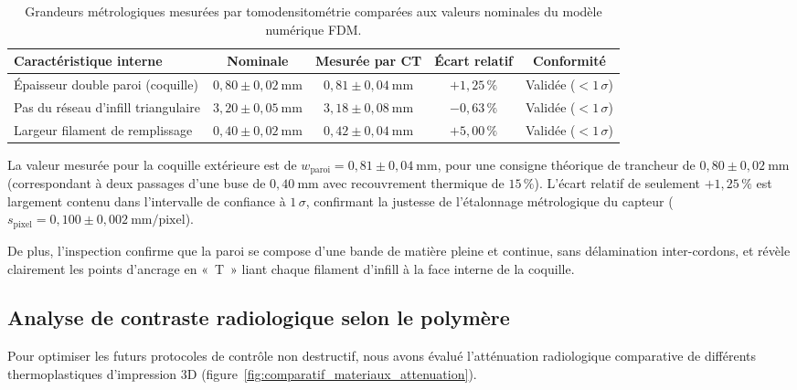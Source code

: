 \begin{table}[h!]
\centering
\small
\setlength{\tabcolsep}{4.5pt}
\caption{Grandeurs métrologiques mesurées par tomodensitométrie comparées aux valeurs nominales du modèle numérique FDM.}
\label{tab:resultats_metrologie}
\begin{tabular}{lcccc}
\toprule
\textbf{Caractéristique interne} & \textbf{Nominale} & \textbf{Mesurée par CT} & \textbf{Écart relatif} & \textbf{Conformité} \\
\midrule
Épaisseur double paroi (coquille) & $0{,}80 \pm 0{,}02~\text{mm}$ & $0{,}81 \pm 0{,}04~\text{mm}$ & $+1{,}25\,\%$ & Validée ($< 1\,\sigma$) \\
Pas du réseau d'infill triangulaire & $3{,}20 \pm 0{,}05~\text{mm}$ & $3{,}18 \pm 0{,}08~\text{mm}$ & $-0{,}63\,\%$ & Validée ($< 1\,\sigma$) \\
Largeur filament de remplissage & $0{,}40 \pm 0{,}02~\text{mm}$ & $0{,}42 \pm 0{,}04~\text{mm}$ & $+5{,}00\,\%$ & Validée ($< 1\,\sigma$) \\
\bottomrule
\end{tabular}
\end{table}

La valeur mesurée pour la coquille extérieure est de $w_{\text{paroi}} = 0{,}81 \pm 0{,}04~\text{mm}$, pour une consigne théorique de trancheur de $0{,}80 \pm 0{,}02~\text{mm}$ (correspondant à deux passages d'une buse de $0{,}40~\text{mm}$ avec recouvrement thermique de $15\,\%$). L'écart relatif de seulement $+1{,}25\,\%$ est largement contenu dans l'intervalle de confiance à $1\,\sigma$, confirmant la justesse de l'étalonnage métrologique du capteur ($s_{\text{pixel}} = 0{,}100 \pm 0{,}002~\text{mm/pixel}$). 

De plus, l'inspection confirme que la paroi se compose d'une bande de matière pleine et continue, sans délamination inter-cordons, et révèle clairement les points d'ancrage en «~T~» liant chaque filament d'infill à la face interne de la coquille.

\subsection{Analyse de contraste radiologique selon le polymère}
Pour optimiser les futurs protocoles de contrôle non destructif, nous avons évalué l'atténuation radiologique comparative de différents thermoplastiques d'impression 3D (figure~\ref{fig:comparatif_materiaux_attenuation}). 

